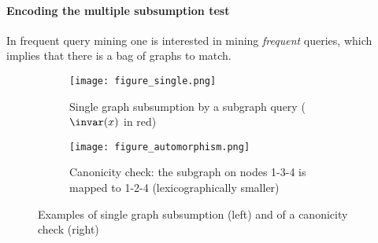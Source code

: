 \paragraph{Encoding the multiple subsumption test}
In frequent query mining one is interested in mining \textit{frequent} queries, which implies that there is a bag of graphs to match. 

\begin{figure}[t]
  \begin{center}
    
  \begin{subfigure}{.44\textwidth}
    \begin{center}
      \texttt{[image: figure\_single.png]}
      \caption{Single graph subsumption by a subgraph query ($\invar(x)$ in red)}
      \label{fig:single}
    \end{center}
    \hfill 
  \end{subfigure}
    \begin{subfigure}{.44\textwidth}
    \begin{center}

      \texttt{[image: figure\_automorphism.png]}
      \caption{Canonicity check: the subgraph on nodes 1-3-4 is mapped to 1-2-4 (lexicographically smaller)}
      \label{fig:automorphism}
    \end{center}
  \end{subfigure}
 
  \caption{Examples of single graph subsumption (left) and of a canonicity check (right)}
  \end{center}
\end{figure}
  

